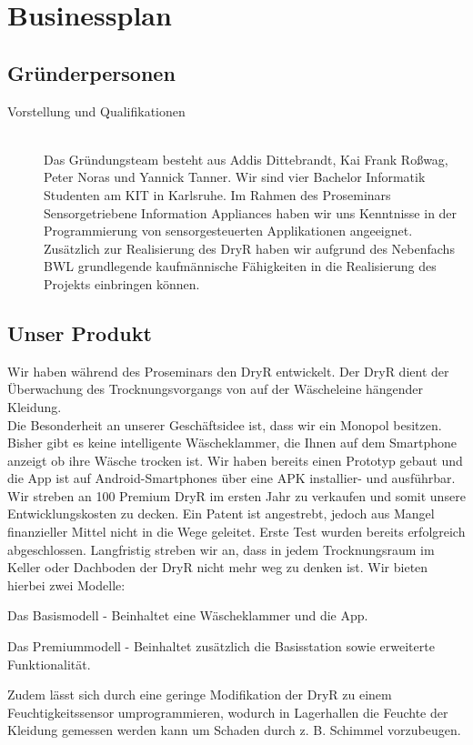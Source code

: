 \section{Businessplan}
\subsection{Gründerpersonen}
	\begin{description}
	\item [Vorstellung und Qualifikationen] \hfill \\
		Das Gründungsteam besteht aus Addis Dittebrandt, Kai Frank Roßwag, Peter Noras und Yannick Tanner.
			Wir sind vier Bachelor Informatik Studenten am KIT in Karlsruhe. Im Rahmen des Proseminars Sensorgetriebene Information Appliances haben wir uns Kenntnisse in der Programmierung von sensorgesteuerten Applikationen angeeignet. Zusätzlich zur Realisierung des DryR haben wir aufgrund des Nebenfachs BWL grundlegende kaufmännische Fähigkeiten in die Realisierung des Projekts einbringen können.
	\end{description}
\subsection{Unser Produkt}
	Wir haben während des Proseminars den DryR entwickelt. Der DryR dient der Überwachung des Trocknungsvorgangs von auf der Wäscheleine hängender Kleidung. \\

	Die Besonderheit an unserer Geschäftsidee ist, dass wir ein Monopol besitzen. Bisher gibt es keine intelligente Wäscheklammer, die Ihnen auf dem Smartphone anzeigt ob ihre Wäsche trocken ist. Wir haben bereits einen Prototyp gebaut und die App ist auf Android-Smartphones über eine APK installier- und ausführbar. Wir streben an 100 Premium DryR im ersten Jahr zu verkaufen und somit unsere Entwicklungskosten zu decken. Ein Patent ist angestrebt, jedoch aus Mangel finanzieller Mittel nicht in die Wege geleitet. Erste Test wurden bereits erfolgreich abgeschlossen. Langfristig streben wir an, dass in jedem Trocknungsraum im Keller oder Dachboden der DryR nicht mehr weg zu denken ist. Wir bieten hierbei zwei Modelle:

	Das Basismodell - Beinhaltet eine Wäscheklammer und die App.

	Das Premiummodell - Beinhaltet zusätzlich die Basisstation sowie erweiterte Funktionalität.

	Zudem lässt sich durch eine geringe Modifikation der DryR zu einem Feuchtigkeitssensor umprogrammieren, wodurch in Lagerhallen die Feuchte der Kleidung gemessen werden kann um Schaden durch z. B. Schimmel vorzubeugen.


